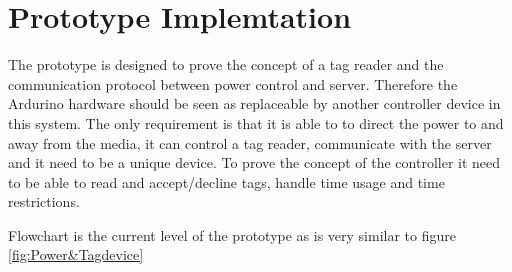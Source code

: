 \section{Prototype Implemtation}
The prototype is designed to prove the concept of a tag reader and the communication protocol between power control and server. Therefore  the Ardurino hardware should be seen as replaceable by another controller device in this system. The only requirement is that it is able to  to direct the power to and away from the media, it can control a tag reader, communicate with the server and it need to be a unique device. To prove the concept of the controller it need to be able to read and accept/decline tags, handle time usage and time restrictions. 


Flowchart is the current level of the prototype as is very similar to figure \ref{fig:Power&Tagdevice} 



    